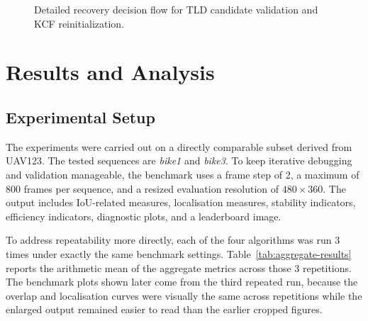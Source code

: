 \documentclass[12pt,a4paper]{article}
\begin{document}
\begin{figure}[htbp]
{
	}
	\caption{Detailed recovery decision flow for TLD candidate validation and KCF reinitialization.}
	\label{fig:kcf-tld-recovery-flow}
\end{figure}
\clearpage

\section{Results and Analysis}

\subsection{Experimental Setup}
The experiments were carried out on a directly comparable subset derived from UAV123. The tested sequences are \emph{bike1} and \emph{bike3}. To keep iterative debugging and validation manageable, the benchmark uses a frame step of 2, a maximum of 800 frames per sequence, and a resized evaluation resolution of $480 \times 360$. The output includes IoU-related measures, localisation measures, stability indicators, efficiency indicators, diagnostic plots, and a leaderboard image.

To address repeatability more directly, each of the four algorithms was run 3 times under exactly the same benchmark settings. Table~\ref{tab:aggregate-results} reports the arithmetic mean of the aggregate metrics across those 3 repetitions. The benchmark plots shown later come from the third repeated run, because the overlap and localisation curves were visually the same across repetitions while the enlarged output remained easier to read than the earlier cropped figures.
\end{document}

